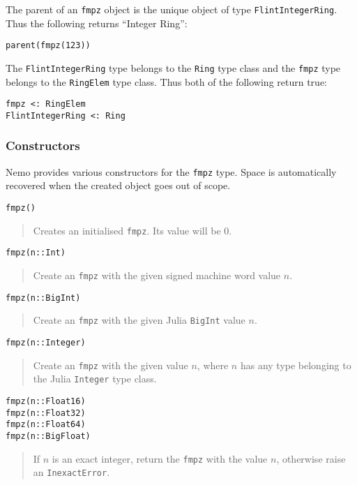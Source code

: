 \documentclass[a4paper,10pt]{article}
\newcommand{\code}{\lstinline}
\newcommand{\desc}[1]{\vspace{-3mm}\begin{quote}#1\end{quote}}
\begin{document}
The parent of an \code{fmpz} object is the unique object of type \code{FlintIntegerRing}. Thus the
following returns ``Integer Ring'':

\begin{lstlisting}
parent(fmpz(123))
\end{lstlisting}

The \code{FlintIntegerRing} type belongs to the \code{Ring} type class and the \code{fmpz} type
belongs to the \code{RingElem} type class. Thus both of the following return true:

\begin{lstlisting}
fmpz <: RingElem
FlintIntegerRing <: Ring
\end{lstlisting}

\subsubsection{Constructors}

Nemo provides various constructors for the \code{fmpz} type. Space is automatically
recovered when the created object goes out of scope.

\begin{lstlisting}
fmpz()
\end{lstlisting}

\desc{Creates an initialised \code{fmpz}. Its value will be $0$.}

\begin{lstlisting}
fmpz(n::Int)
\end{lstlisting}

\desc{Create an \code{fmpz} with the given signed machine word value $n$.}

\begin{lstlisting}
fmpz(n::BigInt)
\end{lstlisting}

\desc{Create an \code{fmpz} with the given Julia \code{BigInt} value $n$.}

\begin{lstlisting}
fmpz(n::Integer)
\end{lstlisting}

\desc{Create an \code{fmpz} with the given value $n$, where $n$ has any type belonging to the Julia
\code{Integer} type class.}

\begin{lstlisting}
fmpz(n::Float16)
fmpz(n::Float32)
fmpz(n::Float64)
fmpz(n::BigFloat)
\end{lstlisting}

\desc{If $n$ is an exact integer, return the \code{fmpz} with the value $n$, otherwise raise an
\code{InexactError}.}
\end{document}
